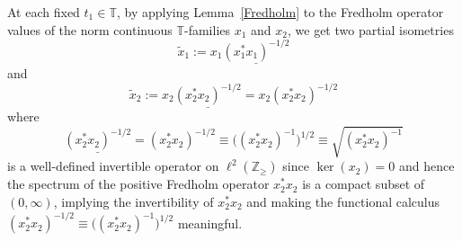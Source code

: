 At each fixed $t_{1}\in\mathbb{T}$, by applying Lemma~\ref{Fredholm} to the Fredholm
operator values of the norm continuous $\mathbb{T}$-families $x_{1}$ and
$x_{2}$, we get two partial isometries
\[
\tilde{x}_{1}:=x_{1}\underline{( x_{1}^{\ast}x_{1}) ^{-1/2}}
\]
and
\[
\tilde{x}_{2}:=x_{2}\underline{( x_{2}^{\ast}x_{2}) ^{-1/2}%
}=x_{2}( x_{2}^{\ast}x_{2}) ^{-1/2}%
\]
where
\[
\underline{( x_{2}^{\ast}x_{2}) ^{-1/2}}=( x_{2}^{\ast
}x_{2}) ^{-1/2}\equiv\big( ( x_{2}^{\ast}x_{2})
^{-1}\big) ^{1/2}\equiv\sqrt{( x_{2}^{\ast}x_{2}) ^{-1}}%
\]
is a well-defined invertible operator on $\ell^{2}( \mathbb{Z}_{\geq
}) $ since $\ker( x_{2}) =0$ and hence the spectrum of the
positive Fredholm operator $x_{2}^{\ast}x_{2}$ is a compact subset of $(
0,\infty) $, implying the invertibility of $x_{2}^{\ast}x_{2}$ and
making the functional calculus $( x_{2}^{\ast}x_{2})
^{-1/2}\equiv\big( ( x_{2}^{\ast}x_{2}) ^{-1}\big) ^{1/2}$ meaningful.

